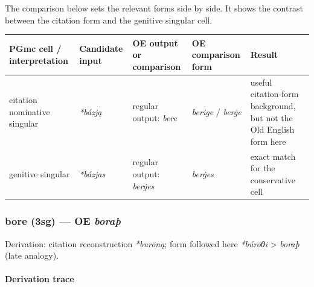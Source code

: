 \documentclass[
  british,
  a4paper,
]{article}
\newcounter{none} %
\begin{document}
The comparison below sets the relevant forms side by side. It shows the
contrast between the citation form and the genitive singular cell.

{\def\LTcaptype{none} %
\begin{longtable}[]{@{}
  >{\raggedright\arraybackslash}p{}
  >{\raggedright\arraybackslash}p{}
  >{\raggedright\arraybackslash}p{}
  >{\raggedright\arraybackslash}p{}
  >{\raggedright\arraybackslash}p{}@{}}
\toprule\noalign{}
\begin{minipage}[b]{\linewidth}\raggedright
PGmc cell / interpretation
\end{minipage} & \begin{minipage}[b]{\linewidth}\raggedright
Candidate input
\end{minipage} & \begin{minipage}[b]{\linewidth}\raggedright
OE output or comparison
\end{minipage} & \begin{minipage}[b]{\linewidth}\raggedright
OE comparison form
\end{minipage} & \begin{minipage}[b]{\linewidth}\raggedright
Result
\end{minipage} \\
\midrule\noalign{}
\endhead
\bottomrule\noalign{}
\endlastfoot
citation nominative singular & {\emph{*bázją}} & regular output:
{\emph{bere}} & {\emph{berige}} / {\emph{berġe}} & useful citation-form
background, but not the Old English form here \\
genitive singular & {\emph{*bázjas}} & regular output: \emph{berġes} &
{\emph{berġes}} & exact match for the conservative cell \\
\end{longtable}
}

\subsubsection{\texorpdfstring{bore (3sg) --- OE
\emph{boraþ}}{bore (3sg) --- OE boraþ}}\label{bore-3sg-oe-borauxfe}

Derivation: citation reconstruction \emph{*burōną}; form followed here
\emph{*búrōθi} \textgreater{} \emph{boraþ} (late analogy).

\paragraph{Derivation trace}\label{derivation-trace-148}
\end{document}
